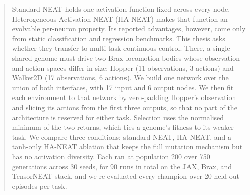 \documentclass[12pt]{article}
\begin{document}
\begin{abstract}
\noindent
Standard NEAT holds one activation function fixed across every node. Heterogeneous Activation NEAT (HA-NEAT) makes that function an evolvable per-neuron property. Its reported advantages, however, come only from static classification and regression benchmarks. This thesis asks whether they transfer to multi-task continuous control. There, a single shared genome must drive two Brax locomotion bodies whose observation and action spaces differ in size: Hopper (11 observations, 3 actions) and Walker2D (17 observations, 6 actions). We build one network over the union of both interfaces, with 17 input and 6 output nodes. We then fit each environment to that network by zero-padding Hopper's observation and slicing its actions from the first three outputs, so that no part of the architecture is reserved for either task. Selection uses the normalised minimum of the two returns, which ties a genome's fitness to its weaker task. We compare three conditions: standard NEAT, HA-NEAT, and a tanh-only HA-NEAT ablation that keeps the full mutation mechanism but has no activation diversity. Each ran at population 200 over 750 generations across 30 seeds, for 90 runs in total on the JAX, Brax, and TensorNEAT stack, and we re-evaluated every champion over 20 held-out episodes per task.


\end{abstract}
\end{document}
